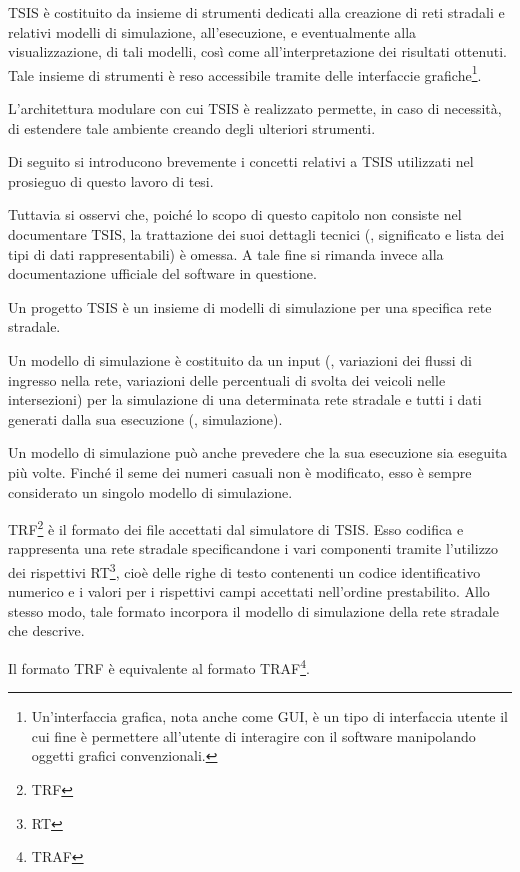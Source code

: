 \acs{TSIS} è costituito da insieme di strumenti dedicati alla creazione di reti stradali e relativi modelli di simulazione, all'esecuzione, e eventualmente alla visualizzazione, di tali modelli, così come all'interpretazione dei risultati ottenuti. Tale insieme di strumenti è reso accessibile tramite delle interfaccie grafiche\footnote{Un'interfaccia grafica, nota anche come \acf{GUI}, è un tipo di interfaccia utente il cui fine è permettere all'utente di interagire con il software manipolando oggetti grafici convenzionali.}.

L'architettura modulare con cui \acs{TSIS} è realizzato permette, in caso di necessità, di estendere tale ambiente creando degli ulteriori strumenti.

Di seguito si introducono brevemente i concetti relativi a \acs{TSIS} utilizzati nel prosieguo di questo lavoro di tesi.

Tuttavia si osservi che, poiché lo scopo di questo capitolo non consiste nel documentare \acs{TSIS}, la trattazione dei suoi dettagli tecnici (\eg{}, significato e lista dei tipi di dati rappresentabili) è omessa. A tale fine si rimanda invece alla documentazione ufficiale del software in questione.

\begin{definizione}\label{defn:tsis-proj}
Un progetto \acs{TSIS} è un insieme di modelli di simulazione per una specifica rete stradale.
\end{definizione}

\begin{definizione}\label{defn:tsis-sim-model}
Un modello di simulazione è costituito da un input (\eg{}, variazioni dei flussi di ingresso nella rete, variazioni delle percentuali di svolta dei veicoli nelle intersezioni) per la simulazione di una determinata rete stradale e tutti i dati generati dalla sua esecuzione (\ie{}, simulazione).
\end{definizione}
\begin{osservazione}
Un modello di simulazione può anche prevedere che la sua esecuzione sia eseguita più volte. Finché il seme dei numeri casuali non è modificato, esso è sempre considerato un singolo modello di simulazione.
\end{osservazione}

\begin{definizione}\label{defn:trf-format}
\acs{TRF}\footnote{\acf{TRF}} è il formato dei file accettati dal simulatore di \acs{TSIS}. Esso codifica e rappresenta una rete stradale specificandone i vari componenti tramite l'utilizzo dei rispettivi \acs{RT}\footnote{\acf{RT}}, cioè delle righe di testo contenenti un codice identificativo numerico e i valori per i rispettivi campi accettati nell'ordine prestabilito. Allo stesso modo, tale formato incorpora il modello di simulazione della rete stradale che descrive.
\end{definizione}
\begin{osservazione}
Il formato \acs{TRF} è equivalente al formato \acs{TRAF}\footnote{\acf{TRAF}}.
\end{osservazione}

